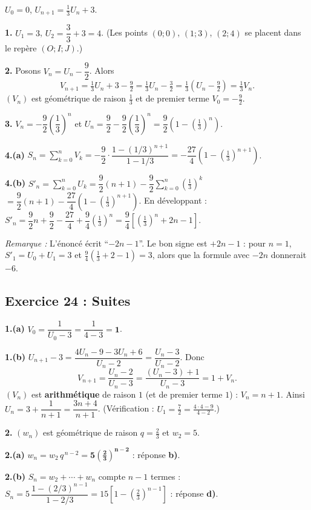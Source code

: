 \documentclass[11pt,a4paper]{article}
\newenvironment{rem}{\par\medskip\noindent\textit{Remarque :}\quad}{\par\medskip}
\begin{document}
$U_0=0$, $U_{n+1}=\frac13U_n+3$.

\textbf{1.} $U_1=3$, $U_2=\dfrac{3}{3}+3=4$. (Les points $(0;0)$, $(1;3)$, $(2;4)$ se placent dans le rep\`ere $(O;I;J)$.)

\textbf{2.} Posons $V_n=U_n-\dfrac92$. Alors
\[
V_{n+1}=\tfrac13U_n+3-\tfrac92=\tfrac13U_n-\tfrac32=\tfrac13\left(U_n-\tfrac92\right)=\tfrac13V_n.
\]
$(V_n)$ est g\'eom\'etrique de raison $\frac13$ et de premier terme $V_0=-\frac92$.

\textbf{3.} $V_n=-\dfrac92\left(\dfrac13\right)^n$ et $U_n=\dfrac92-\dfrac92\left(\dfrac13\right)^n=\dfrac92\left(1-\left(\tfrac13\right)^n\right)$.

\textbf{4.(a)} $S_n=\sum_{k=0}^nV_k=-\dfrac92\cdot\dfrac{1-(1/3)^{n+1}}{1-1/3}=-\dfrac{27}{4}\left(1-\left(\tfrac13\right)^{n+1}\right)$.

\textbf{4.(b)} $S'_n=\sum_{k=0}^nU_k=\dfrac92(n+1)-\dfrac92\sum_{k=0}^n\left(\tfrac13\right)^k$
$=\dfrac92(n+1)-\dfrac{27}{4}\left(1-\left(\tfrac13\right)^{n+1}\right)$.
En d\'eveloppant : $S'_n=\dfrac92n+\dfrac92-\dfrac{27}{4}+\dfrac{9}{4}\left(\tfrac13\right)^n=\dfrac94\left[\left(\tfrac13\right)^n+2n-1\right]$.
\begin{rem} L'\'enonc\'e \'ecrit ``$-2n-1$''. Le bon signe est $+2n-1$ : pour $n=1$, $S'_1=U_0+U_1=3$ et
$\frac94\left(\frac13+2-1\right)=3$, alors que la formule avec $-2n$ donnerait $-6$.\end{rem}

\subsection{Exercice 24 : Suites}

\textbf{1.(a)} $V_0=\dfrac{1}{U_0-3}=\dfrac{1}{4-3}=\mathbf{1}$.

\textbf{1.(b)} $U_{n+1}-3=\dfrac{4U_n-9-3U_n+6}{U_n-2}=\dfrac{U_n-3}{U_n-2}$. Donc
\[
V_{n+1}=\frac{U_n-2}{U_n-3}=\frac{(U_n-3)+1}{U_n-3}=1+V_n.
\]
$(V_n)$ est \textbf{arithm\'etique} de raison $1$ (et de premier terme $1$) : $V_n=n+1$.
Ainsi $U_n=3+\dfrac{1}{n+1}=\dfrac{3n+4}{n+1}$. (V\'erification : $U_1=\frac72=\frac{4\cdot4-9}{4-2}$.)

\textbf{2.} $(w_n)$ est g\'eom\'etrique de raison $q=\frac23$ et $w_2=5$.

\textbf{2.(a)} $w_n=w_2\,q^{\,n-2}=\mathbf{5\left(\tfrac23\right)^{n-2}}$ : r\'eponse \textbf{b)}.

\textbf{2.(b)} $S_n=w_2+\cdots+w_n$ compte $n-1$ termes :
$S_n=5\,\dfrac{1-(2/3)^{n-1}}{1-2/3}=15\left[1-\left(\tfrac23\right)^{n-1}\right]$ : r\'eponse \textbf{d)}.
\end{document}
